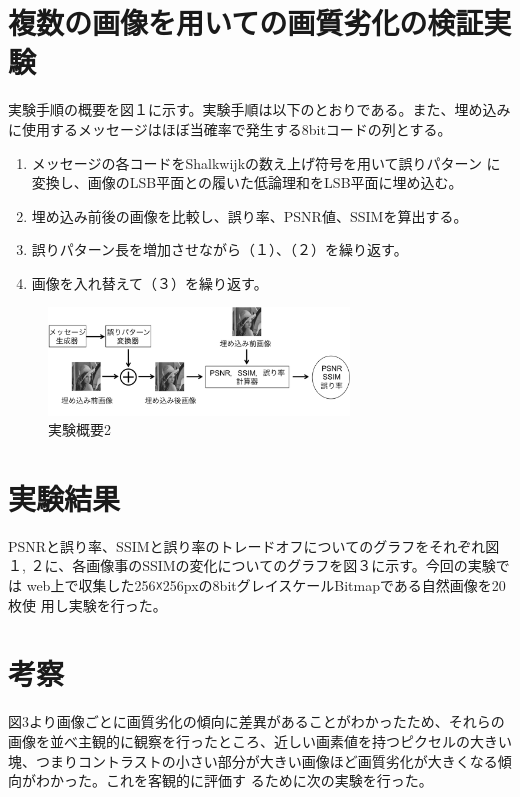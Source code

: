 \documentclass[a4j,fleqn,10pt]{jsarticle}
\begin{document}
\section{複数の画像を用いての画質劣化の検証実験}
実験手順の概要を図１に示す。実験手順は以下のとおりである。また、埋め込み
に使用するメッセージはほぼ当確率で発生する8bitコードの列とする。
\begin{enumerate}
\renewcommand{\labelenumi}{(\arabic{enumi})}
 \item メッセージの各コードをShalkwijkの数え上げ符号を用いて誤りパターン
       に変換し、画像のLSB平面との履いた低論理和をLSB平面に埋め込む。
 \item 埋め込み前後の画像を比較し、誤り率、PSNR値、SSIMを算出する。
 \item 誤りパターン長を増加させながら（１）、（２）を繰り返す。
 \item 画像を入れ替えて（３）を繰り返す。
\end{enumerate}

\begin{figure}[htbp]
 \begin{center}
  \includegraphics[width=8cm]{experiment1.png}
 \end{center}
 \caption{実験概要2}
\end{figure}

\section{実験結果}
PSNRと誤り率、SSIMと誤り率のトレードオフについてのグラフをそれぞれ図１,
２に、各画像事のSSIMの変化についてのグラフを図３に示す。今回の実験では
web上で収集した256☓256pxの8bitグレイスケールBitmapである自然画像を20枚使
用し実験を行った。

\section{考察}
図3より画像ごとに画質劣化の傾向に差異があることがわかったため、それらの
画像を並べ主観的に観察を行ったところ、近しい画素値を持つピクセルの大きい
塊、つまりコントラストの小さい部分が大きい画像ほど画質劣化が大きくなる傾向がわかった。これを客観的に評価す
るために次の実験を行った。
\end{document}
